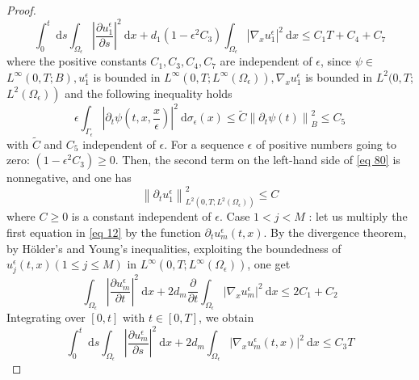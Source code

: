 \begin{proof}
\begin{equation}
  \int_{0}^{t} \mathrm{~d} s \int_{\Omega_{\epsilon}}\left|\frac{\partial u_{1}^{\epsilon}}{\partial s}\right|^{2} \mathrm{~d} x+d_{1}\left(1-\epsilon^{2} C_{3}\right) \int_{\Omega_{\epsilon}}\left|\nabla_{x} u_{1}^{\epsilon}\right|^{2} \mathrm{~d} x \leq C_{1} T+C_{4}+C_{7}
\label{eq 80}\end{equation}
where the positive constants $C_{1}, C_{3}, C_{4}, C_{7}$ are independent of $\epsilon$, since $\psi \in$ $L^{\infty}(0, T ; B), u_{1}^{\epsilon}$ is bounded in $L^{\infty}\left(0, T ; L^{\infty}\left(\Omega_{\epsilon}\right)\right), \nabla_{x} u_{1}^{\epsilon}$ is bounded in $L^{2}(0, T$; $\left.L^{2}\left(\Omega_{\epsilon}\right)\right)$ and the following inequality holds
$$
\epsilon \int_{\Gamma_{\epsilon}}\left|\partial_{t} \psi\left(t, x, \frac{x}{\epsilon}\right)\right|^{2} \mathrm{~d} \sigma_{\epsilon}(x) \leq \tilde{C}\left\|\partial_{t} \psi(t)\right\|_{B}^{2} \leq C_{5}
$$
with $\tilde{C}$ and $C_{5}$ independent of $\epsilon$. For a sequence $\epsilon$ of positive numbers going to zero: $\left(1-\epsilon^{2} C_{3}\right) \geq 0$. Then, the second term on the left-hand side of \eqref{eq 80} is nonnegative, and one has
\begin{equation}
  \left\|\partial_{t} u_{1}^{\epsilon}\right\|_{L^{2}\left(0, T ; L^{2}\left(\Omega_{\epsilon}\right)\right)}^{2} \leq C
\label{eq 81}\end{equation}
where $C \geq 0$ is a constant independent of $\epsilon$.
Case $1<j<M$ : let us multiply the first equation in \eqref{eq 12} by the function $\partial_{t} u_{m}^{\epsilon}(t, x)$. By the divergence theorem, by Hölder's and Young's inequalities, exploiting the boundedness of $u_{j}^{\epsilon}(t, x)(1 \leq j \leq M)$ in $L^{\infty}\left(0, T ; L^{\infty}\left(\Omega_{\epsilon}\right)\right)$, one get
\begin{equation}
  \int_{\Omega_{\epsilon}}\left|\frac{\partial u_{m}^{\epsilon}}{\partial t}\right|^{2} \mathrm{~d} x+2 d_{m} \frac{\partial}{\partial t} \int_{\Omega_{\epsilon}}\left|\nabla_{x} u_{m}^{\epsilon}\right|^{2} \mathrm{~d} x \leq 2 C_{1}+C_{2}
\label{eq 82}\end{equation}
Integrating over $[0, t]$ with $t \in[0, T]$, we obtain
\begin{equation}
  \int_{0}^{t} \mathrm{~d} s \int_{\Omega_{\epsilon}}\left|\frac{\partial u_{m}^{\epsilon}}{\partial s}\right|^{2} \mathrm{~d} x+2 d_{m} \int_{\Omega_{\epsilon}}\left|\nabla_{x} u_{m}^{\epsilon}(t, x)\right|^{2} \mathrm{~d} x \leq C_{3} T

\end{equation}
\end{proof}
